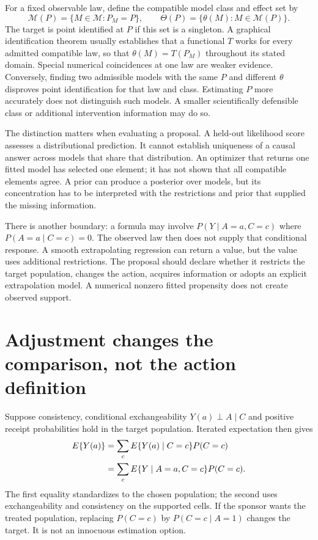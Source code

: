 For a fixed observable law, define the compatible model class and effect set by
\[
 \mathcal M(P)=\{M\in\mathcal M:P_M=P\},\qquad
 \Theta(P)=\{\theta(M):M\in\mathcal M(P)\}.
\]
The target is point identified at $P$ if this set is a singleton. A graphical
identification theorem usually establishes that a functional $T$ works for
every admitted compatible law, so that $\theta(M)=T(P_M)$ throughout its
stated domain. Special numerical coincidences at one law are weaker evidence.
Conversely, finding two admissible models with the same $P$ and different
$\theta$ disproves point identification for that law and class. Estimating
$P$ more accurately does not distinguish such models. A smaller scientifically
defensible class or additional intervention information may
do so.~\citep{id2006,pearl2009}

The distinction matters when evaluating a proposal. A held-out likelihood
score assesses a distributional prediction. It cannot establish uniqueness
of a causal answer across models that share that distribution. An optimizer
that returns one fitted model has selected one element; it has not shown that
all compatible elements agree. A prior can produce a posterior over models,
but its concentration has to be interpreted with the restrictions and prior
that supplied the missing information.

There is another boundary: a formula may involve $P(Y\mid A=a,C=c)$ where
$P(A=a\mid C=c)=0$. The observed law then does not supply that conditional
response. A smooth extrapolating regression can return a value, but the value
uses additional restrictions. The proposal should declare whether it restricts
the target population, changes the action, acquires information or adopts
an explicit extrapolation model. A numerical nonzero fitted propensity
does not create observed support.

\section{Adjustment changes the comparison, not the action definition}
\label{exec17:s3-adjust}

Suppose consistency, conditional exchangeability
$Y(a)\mathrel{\perp}A\mid C$ and positive receipt probabilities hold in the
target population. Iterated expectation then gives
\begin{align}
 E\{Y(a)\}
 &=\sum_c E\{Y(a)\mid C=c\}P(C=c) \notag\\
 &=\sum_c E\{Y\mid A=a,C=c\}P(C=c).
 \label{exec17:s3-adjustment}
\end{align}
The first equality standardizes to the chosen population; the second uses
exchangeability and consistency on the supported cells. If the sponsor wants
the treated population, replacing $P(C=c)$ by $P(C=c\mid A=1)$ changes the
target. It is not an innocuous estimation option.

